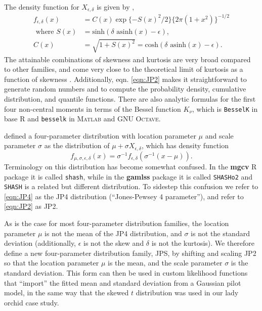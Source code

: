 \documentclass[12pt]{article}
\newcommand{\be}{\begin{equation}}
\newcommand{\ee}{\end{equation}}
\begin{document}
\begin{spacing}{1.35}
	The density function for $X_{\epsilon,\delta}$ is given by \citet[][eqn. 2]{jones-pewsey-2009}, 
	\be
	\begin{aligned}
		f_{ \epsilon,\delta}(x) & = C(x) \exp\{-S(x)^2/2\} \{2\pi(1+x^2)\}^{-1/2}  \\
		\mbox{ where }  S(x) & =  \mbox{sinh}(\delta \mbox{ asinh}(x)- \epsilon), \\
		C(x)  & =  \sqrt{1 + S(x)^2} = \mbox{cosh}(\delta \mbox{ asinh}(x)- \epsilon).
	\end{aligned} 
	\ee
	The attainable combinations of skewness and kurtosis are 
	very broad compared to other families, and come very close to the theoretical limit of
	kurtosis as a function of skewness \citep[][Fig.  2]{jones-pewsey-2009}. 
	Additionally, eqn. \eqref{eqn:JP2} makes it straightforward to generate random numbers and to compute 
	the probability density, cumulative distribution, and quantile functions. 
	There are also analytic formulas for the first four non-central 
	moments \citep[][p. 764]{jones-pewsey-2009} in terms of the Bessel function $K_{\nu}$, which is
	\texttt{BesselK} in base R and \texttt{besselk} in \textsc{Matlab} and GNU \textsc{Octave}.
	
	\citet{jones-pewsey-2009} defined a four-parameter distribution with location 
	parameter $\mu$ and scale parameter $\sigma$ as the distribution of $\mu + \sigma X_{\epsilon, \delta}$, 
	which has density function 
	\be
	f_{\mu, \sigma,  \epsilon,\delta}(x)  = \sigma^{-1}f_{ \epsilon,\delta}( \sigma^{-1}(x - \mu)). 
	\label{eqn:JP4} 
	\ee
	Terminology on this distribution has become somewhat confused. In the \textbf{mgcv} R package 
	it is called \texttt{shash}, while in the \textbf{gamlss} package it is called \texttt{SHASHo2} 
	and \texttt{SHASH} is a related but different distribution. To sidestep 
	this confusion we refer to \eqref{eqn:JP4} as the JP4 distribution (``Jones-Pewsey 4 parameter''), 
	and refer to \eqref{eqn:JP2} as JP2. 
	
	As is the case for most four-parameter distribution families, 
	the location parameter $\mu$ is not the mean of the JP4 distribution, 
	and $\sigma$ is not the standard deviation (additionally, $\epsilon$ is not the skew and $\delta$ is not the kurtosis). 
	We therefore define a new four-parameter distribution family, JPS, by shifting and scaling JP2
	so that the location parameter $\mu$ is the mean, and the scale parameter $\sigma$ is the standard deviation. 
	This form can then be used in custom likelihood functions that ``import'' the fitted mean 
	and standard deviation from a Gaussian pilot model, in the same way that the skewed $t$ distribution 
	was used in our lady orchid case study. 
	

\end{spacing}
\end{document}
